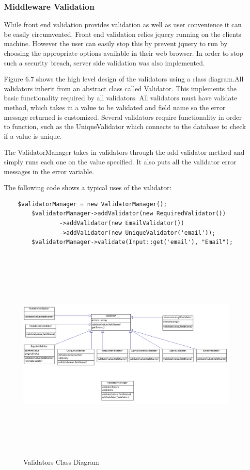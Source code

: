 \documentclass[a4paper,oneside,11pt]{report}
\begin{document}
\pagebreak

\subsubsection{Middleware Validation}
While front end validation provides validation as well as user convenience it can be easily circumvented. Front end validation relies jquery running on the clients machine. However the user can easily stop this by prevent jquery to run by choosing the appropriate options available in their web browser. In order to stop such a security breach, server side validation was also implemented.

Figure 6.7 shows the high level design of the validators using a class diagram.All validators inherit from an abstract class called Validator. This implements the basic functionality required by all validators. All validators must have validate method, which takes in a value to be validated and field name so the error message returned is customized. Several validators require functionality in order to function, such as the UniqueValidator which connects to the database to check if a value is unique.

The ValidatorManager takes in validators through the add validator method and simply runs each one on the value specified. It also puts all the validator error messages in the error variable.

The following code shows a typical uses of the validator:
\begin{lstlisting}
	$validatorManager = new ValidatorManager();	
        $validatorManager->addValidator(new RequiredValidator())
                ->addValidator(new EmailValidator())
                ->addValidator(new UniqueValidator('email'));
        $validatorManager->validate(Input::get('email'), "Email");
\end{lstlisting}

\begin{figure}
\centering
\includegraphics[width=\textwidth,height=11cm]{validator-class-diagram}
\caption{Validators Class Diagram}
\end{figure}
\end{document}

